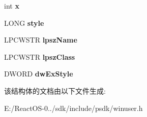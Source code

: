 \begin{DoxyCompactItemize}
int {\bfseries x}
\item 
\mbox{\label{structtag_c_r_e_a_t_e_s_t_r_u_c_t_w_a22ad9390ad23ebf50a22d1fc75693a87}} 
L\+O\+NG {\bfseries style}
\item 
\mbox{\label{structtag_c_r_e_a_t_e_s_t_r_u_c_t_w_a67e94d267833a0c5e21bf82f98339605}} 
L\+P\+C\+W\+S\+TR {\bfseries lpsz\+Name}
\item 
\mbox{\label{structtag_c_r_e_a_t_e_s_t_r_u_c_t_w_a0826873fc31cabb7576a90f3d26917af}} 
L\+P\+C\+W\+S\+TR {\bfseries lpsz\+Class}
\item 
\mbox{\label{structtag_c_r_e_a_t_e_s_t_r_u_c_t_w_a541c74b58611548922d9606e5adb18c4}} 
D\+W\+O\+RD {\bfseries dw\+Ex\+Style}
\end{DoxyCompactItemize}


该结构体的文档由以下文件生成\+:\begin{DoxyCompactItemize}
\item 
E\+:/\+React\+O\+S-\/0../sdk/include/psdk/winuser.\+h\end{DoxyCompactItemize}
